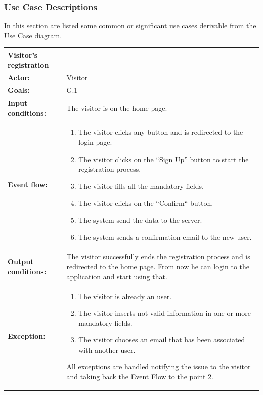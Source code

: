 \subsubsection{Use Case Descriptions}

In this section are listed some common or significant use cases derivable from
the Use Case diagram.

\begin{tabular} { p{5cm} p{8cm} } 
\textbf{Visitor's registration} & \\
\hline
\textbf{Actor:} & Visitor \\ 
\textbf{Goals:} & G.1 \\ 
\textbf{Input conditions:} & The visitor is on the home page. \\
\textbf{Event flow:} & \begin{enumerate}
						\item
						The visitor clicks any button and is redirected to the login page.
						\item
						The visitor clicks on the “Sign Up” button to start the registration process.
						\item
						The visitor fills all the mandatory fields.
						\item
						The visitor clicks on the “Confirm“ button.
						\item
						The system send the data to the server.
						\item
						The system sends a confirmation email to the new user.
						\end{enumerate}\\ 
\textbf{Output conditions:} & The visitor successfully ends the registration process and is redirected to the home page. From now he can login to the application and start using that. \\ 
\textbf{Exception:} & \begin{enumerate}
						\item
						The visitor is already an user.
						\item
						The visitor inserts not valid information in one or more mandatory fields.
						\item
						The visitor chooses an email that has been associated with another user.
					\end{enumerate}
All exceptions are handled notifying the issue to the visitor and taking back the Event Flow to the point 2. \\
\hline
\end{tabular}



